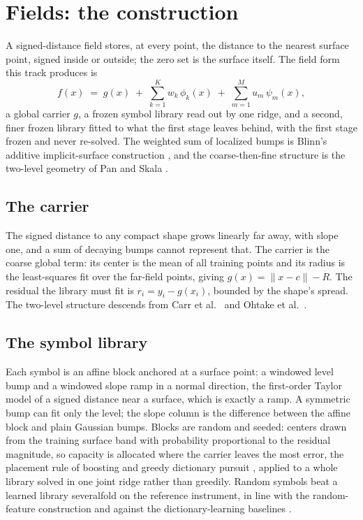 \documentclass[11pt]{article}
\begin{document}
\section{Fields: the construction}

A signed-distance field stores, at every point, the distance to the
nearest surface point, signed inside or outside; the zero set is
the surface itself. The field form this track produces is
\begin{equation}
f(x) \;=\; g(x) \;+\; \sum_{k=1}^{K} w_k\,\phi_k(x)
  \;+\; \sum_{m=1}^{M} u_m\,\psi_m(x),
\label{eq:field}
\end{equation}
a global carrier $g$, a frozen symbol library read out by one
ridge, and a second, finer frozen library fitted to what the first
stage leaves behind, with the first stage frozen and never
re-solved. The weighted sum of localized bumps is Blinn's additive
implicit-surface construction \cite{blinn1982}, and the
coarse-then-fine structure is the two-level geometry of Pan and
Skala \cite{pan2011}.

\subsection{The carrier}

The signed distance to any compact shape grows linearly far away,
with slope one, and a sum of decaying bumps cannot represent that.
The carrier is the coarse global term: its center is the mean of
all training points and its radius is the least-squares fit over
the far-field points, giving $g(x) = \|x - c\| - R$. The residual
the library must fit is $r_i = y_i - g(x_i)$, bounded by the
shape's spread. The two-level structure descends from Carr et
al.~\cite{carr2001} and Ohtake et al.~\cite{ohtake2003}.

\subsection{The symbol library}

Each symbol is an affine block anchored at a surface point: a
windowed level bump and a windowed slope ramp in a normal
direction, the first-order Taylor model of a signed distance near a
surface, which is exactly a ramp. A symmetric bump can fit only the
level; the slope column is the difference between the affine block
and plain Gaussian bumps. Blocks are random and seeded: centers
drawn from the training surface band with probability proportional
to the residual magnitude, so capacity is allocated where the
carrier leaves the most error, the placement rule of boosting
\cite{friedman2001} and greedy dictionary pursuit
\cite{mallatzhang1993}, applied to a whole library solved in one
joint ridge rather than greedily. Random symbols beat a learned
library severalfold on the reference instrument, in line with the
random-feature construction \cite{rahimi2007} and against the
dictionary-learning baselines \cite{aharon2006, mairal2010}.
\end{document}
